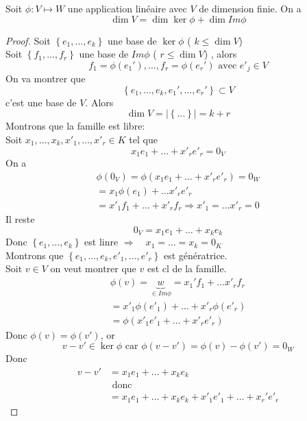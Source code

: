 \documentclass[../main.tex]{subfiles}
\begin{document}
\begin{thm}
	Soit $\phi: V \mapsto W$ une application linéaire avec $V$ de dimension finie. On a
	\[ 
	\dim V = \dim \ker \phi + \dim Im \phi
	\]
	
	
\end{thm}
\begin{proof}
	Soit $ \left\{ e_1, \ldots, e_k \right\} $ une base de $\ker \phi$ ( $k \leq \dim V$) \\
	Soit $ \left\{ f_1, \ldots, f_r \right\} $ une base de $Im \phi$ ( $r \leq \dim V$) , alors
	\[ 
		f_1= \phi( e_1') , \ldots, f_r = \phi( e_r') \text{ avec } e'_j \in V
	\]
On va montrer que
\[ 
\left\{ e_1, \ldots, e_k, e_1', \ldots, e_r' \right\} \subset V
\]
c'est une base de $V$. Alors
\[ 
\dim V  = | \left\{ ... \right\} | = k+r
\]
Montrons que la famille est libre:\\
Soit $x_1, \ldots, x_k, x'_1, \ldots, x'_r\in K$ tel que
\[ 
x_1 e_1 + \ldots + x'_r e'_r = 0_V
\]
On a 
\begin{align*}
\phi( 0_V) = \phi( x_1e_1 + \ldots + x'_r e'_r) = 0_W\\
= x_1 \phi( e_1)  + \ldots x'_r e'_r\\
= x'_1 f_1 + \ldots + x'_r f_r \Rightarrow x'_1 = \ldots x'_r = 0
\end{align*}
Il reste
\[ 
0_V = x_1 e_1 + \ldots + x_k e_k
\]
Donc $ \left\{ e_1, \ldots, e_k \right\} $ est linre $\Rightarrow \quad x_1 = \ldots = x_k=  0_K$ \\
Montrons que $ \left\{ e_1, \ldots, e_k, e'_1, \ldots, e'_r \right\} $ est génératrice.\\
Soit $v \in V$ on veut montrer que $v$ est cl de la famille.\\
\begin{align*}
\phi( v) = \underbrace{w}_{\in Im \phi} = x_1' f_1 + \ldots x'_r f_r\\
= x'_1 \phi( e'_1)  + \ldots + x'_r \phi( e'_r) \\
= \phi( x'_1 e'_1 + \ldots + x'_r e'_r)
\end{align*}
Donc $\phi( v) = \phi( v') $, or
\[ 
	v - v' \in \ker \phi \text{ car } \phi( v- v') = \phi( v) - \phi( v') = 0_W
\]
Donc 
\begin{align*}
	v-v' &= x_1e_1 + \ldots + x_k e_k\\
	     &\text{ donc } \\
	     &= x_1 e_1 + \ldots + x_k e_k + x'_1 e'_1 + \ldots + x_r' e'_r
\end{align*}





\end{proof}
\end{document}
